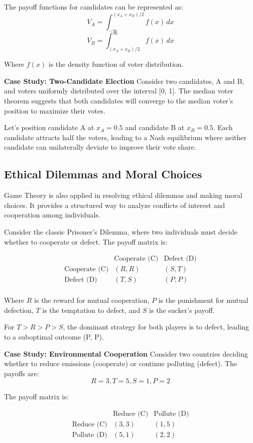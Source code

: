 \documentclass[12pt]{book} %
\begin{document}
The payoff functions for candidates can be represented as:
\[
V_A = \int_{-\infty}^{(x_A + x_B)/2} f(x) \, dx
\]
\[
V_B = \int_{(x_A + x_B)/2}^{\infty} f(x) \, dx
\]

Where \( f(x) \) is the density function of voter distribution.

\textbf{Case Study: Two-Candidate Election}
Consider two candidates, A and B, and voters uniformly distributed over the interval [0, 1]. The median voter theorem suggests that both candidates will converge to the median voter's position to maximize their votes.

Let's position candidate A at \( x_A = 0.5 \) and candidate B at \( x_B = 0.5 \). Each candidate attracts half the voters, leading to a Nash equilibrium where neither candidate can unilaterally deviate to improve their vote share.

\subsection{Ethical Dilemmas and Moral Choices}
Game Theory is also applied in resolving ethical dilemmas and making moral choices. It provides a structured way to analyze conflicts of interest and cooperation among individuals.

Consider the classic Prisoner's Dilemma, where two individuals must decide whether to cooperate or defect. The payoff matrix is:

\[
\begin{array}{c|c|c}
 & \text{Cooperate (C)} & \text{Defect (D)} \\
\hline
\text{Cooperate (C)} & (R, R) & (S, T) \\
\text{Defect (D)} & (T, S) & (P, P) \\
\end{array}
\]

Where \( R \) is the reward for mutual cooperation, \( P \) is the punishment for mutual defection, \( T \) is the temptation to defect, and \( S \) is the sucker's payoff.

For \( T > R > P > S \), the dominant strategy for both players is to defect, leading to a suboptimal outcome (P, P).

\textbf{Case Study: Environmental Cooperation}
Consider two countries deciding whether to reduce emissions (cooperate) or continue polluting (defect). The payoffs are:
\[
R = 3, T = 5, S = 1, P = 2
\]

The payoff matrix is:

\[
\begin{array}{c|c|c}
 & \text{Reduce (C)} & \text{Pollute (D)} \\
\hline
\text{Reduce (C)} & (3, 3) & (1, 5) \\
\text{Pollute (D)} & (5, 1) & (2, 2) \\
\end{array}
\]
\end{document}
